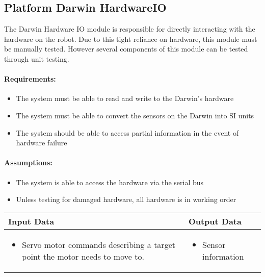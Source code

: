 \documentclass[english,12pt]{scrartcl}
\begin{document}
	\subsection{Platform Darwin HardwareIO}
		The Darwin Hardware IO module is responsible for directly interacting with the hardware on the robot.
		Due to this tight reliance on hardware, this module must be manually tested.
		However several components of this module can be tested through unit testing.

		\paragraph{Requirements:}
		\begin{itemize}
			\item The system must be able to read and write to the Darwin's hardware
			\item The system must be able to convert the sensors on the Darwin into SI units
			\item The system should be able to access partial information in the event of hardware failure
		\end{itemize}

		\paragraph{Assumptions:}
		\begin{itemize}
			\item The system is able to access the hardware via the serial bus
			\item Unless testing for damaged hardware, all hardware is in working order
		\end{itemize}

		\begin{tabular}{p{7cm}|p{7cm}}
			\textbf{Input Data} & \textbf{Output Data} \\ \hline
			\begin{itemize}
				\item Servo motor commands describing a target point the motor needs to move to.
			\end{itemize}
			&
			\begin{itemize}
				\item Sensor information
			\end{itemize}
		\end{tabular}
\end{document}
